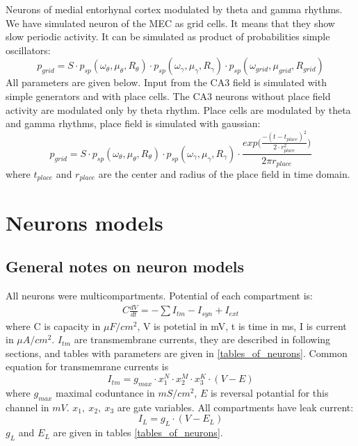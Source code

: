 \documentclass[a4paper,12pt]{article}
\begin{document}
Neurons of medial entorhynal cortex modulated by theta and gamma rhythms. We have simulated neuron of the MEC as grid cells. It means that they show slow periodic activity. It can be simulated as product of probabilities simple oscillators:  
\begin{equation}
p_{grid} = S \cdot p_{sp}(\omega_{\theta}, \mu_{\theta}, R_{\theta}) \cdot  p_{sp}(\omega_{\gamma}, \mu_{\gamma}, R_{\gamma}) \cdot  p_{sp}(\omega_{grid}, \mu_{grid}, R_{grid})
\end{equation}
All parameters are given below.
Input from the CA3 field is simulated with simple generators and with place cells. The CA3 neurons without place field activity are modulated only by theta rhythm. Place cells are modulated by theta and gamma rhythms, place field is simulated with gaussian:  
\begin{equation}
p_{grid} = S \cdot p_{sp}(\omega_{\theta}, \mu_{\theta}, R_{\theta}) \cdot  p_{sp}(\omega_{\gamma}, \mu_{\gamma}, R_{\gamma}) \cdot 
\frac{exp \Big( \frac{-(t - t_{place})^2}{2 \cdot r_{place}^2}  \Big)}{2 \pi r_{place}}  
\end{equation}
where $t_{place}$ and $r_{place}$ are the center and radius of the place field in time domain.



\section{Neurons models}
\subsection{General notes on neuron models}
All neurons were multicompartments. Potential of each compartment is: 
\begin{eqnarray}
\label{eq:comon_potential}
C\frac{dV}{dt}=-\sum{I_{tm}}-I_{syn} + I_{ext}
\end{eqnarray}
where C is capacity in $\mu F/ cm^2$, V is potetial in mV, t is time in ms, I is current in $\mu A/cm^2$. $I_{tm}$ are transmembrane currents, they are described in following sections, and tables with parameters are given in \ref{tables_of_neurons}. Common equation for transmemrane currents is
\begin{equation}
I_{tm}= g_{max}\cdot x_1^N\cdot x_2^M \cdot x_3^K \cdot (V-E)
\end{equation}
where $ g_{max}$ maximal coduntance in $mS/ cm^2$, $E$ is reversal potantial for this channel in $mV$. $x_1,\ x_2, \ x_3$ are gate variables. All compartments have leak current:
\begin{equation}
I_{L}= g_{L} \cdot (V - E_{L})
\end{equation}
$g_{L}$ and $E_{L}$ are given in tables \ref{tables_of_neurons}.
\end{document}
